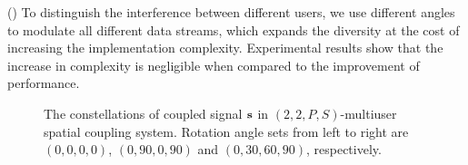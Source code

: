 \documentclass[conference]{IEEEtran}
\begin{document}
(\uppercase\expandafter{}) To distinguish the interference between different users, we use different angles to modulate all different data streams, which expands the diversity at the cost of increasing the implementation complexity. Experimental results show that the increase in complexity is negligible when compared to the improvement of performance.
\begin{figure}[h!]
\setlength{\abovecaptionskip}{0.cm}
\setlength{\belowcaptionskip}{-0.cm}
  \caption{The constellations of coupled signal ${\bf{s}}$ in $(2,2,P,S)$-multiuser spatial coupling system. Rotation angle sets from left to right are $\left( {0,0,0,0} \right)$, $\left( {0,90,0,90} \right)$ and $\left( {0,30,60,90} \right)$, respectively.}\label{fig.4}
    \vspace{-1em}
\end{figure}
\end{document}
